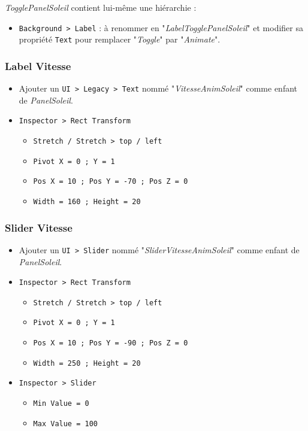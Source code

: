 \documentclass[a4paper,10pt]{article}
\newenvironment{solution}%
{\begin{tcolorbox}[breakable,colback=red!5!white,colframe=red!75!black,title=Solution]}%
{\end{tcolorbox}}
\begin{document}
\begin{solution}
\textit{TogglePanelSoleil} contient lui-même une hiérarchie : 
\begin{itemize}
	\item  \texttt{Background > Label} : à renommer en "\textit{LabelTogglePanelSoleil}" et modifier sa propriété \texttt{Text} pour remplacer "\textit{Toggle}" par "\textit{Animate}".
	\end{itemize}

\subsubsection{Label Vitesse}
\begin{itemize}
	\item Ajouter un \texttt{UI > Legacy > Text} nommé "\textit{VitesseAnimSoleil}" comme enfant de \textit{PanelSoleil}.
	\item \texttt{Inspector > Rect Transform}
	\begin{itemize}
		\item \texttt{Stretch / Stretch > top / left}
		\item \texttt{Pivot X = 0 ; Y = 1}
		\item \texttt{Pos X = 10 ; Pos Y = -70 ; Pos Z = 0}
		\item \texttt{Width = 160 ; Height = 20}	
	\end{itemize}
\end{itemize}

\subsubsection{Slider Vitesse}
\begin{itemize}
	\item Ajouter un \texttt{UI > Slider} nommé "\textit{SliderVitesseAnimSoleil}" comme enfant de \textit{PanelSoleil}.
	\item \texttt{Inspector > Rect Transform}
	\begin{itemize}
		\item \texttt{Stretch / Stretch > top / left}
		\item \texttt{Pivot X = 0 ; Y = 1}
		\item \texttt{Pos X = 10 ; Pos Y = -90 ; Pos Z = 0}
		\item \texttt{Width = 250 ; Height = 20}	
	\end{itemize}
\item \texttt{Inspector > Slider}
\begin{itemize}
	\item \texttt{Min Value = 0}
	\item \texttt{Max Value = 100}
\end{itemize}
\end{itemize}


\end{solution}
\end{document}
